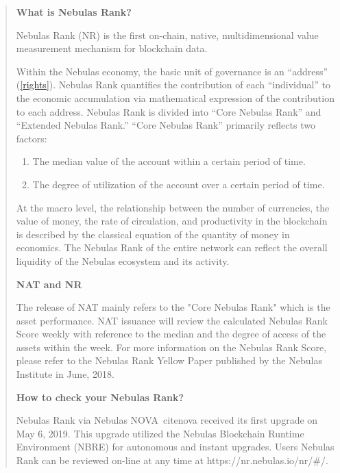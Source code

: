 \begin{quote}
	\textbf{What is Nebulas Rank?}
		
	Nebulas Rank (NR) is the first on-chain, native, multidimensional value measurement mechanism for blockchain data.

	Within the Nebulas economy, the basic unit of governance is an “address” (\ref{rights}). Nebulas Rank quantifies the contribution of each “individual” to the economic accumulation via mathematical expression of the contribution to each address. Nebulas Rank is divided into “Core Nebulas Rank” and “Extended Nebulas Rank.” “Core Nebulas Rank” primarily reflects two factors:

	\begin{enumerate}
		\item The median value of the account within a certain period of time.
		\item The degree of utilization of the account over a certain period of time.
	\end{enumerate}

	At the macro level, the relationship between the number of currencies, the value of money, the rate of circulation, and productivity in the blockchain is described by the classical equation of the quantity of money in economics. The Nebulas Rank of the entire network can reflect the overall liquidity of the Nebulas ecosystem and its activity.

	\vspace{2em}

	\textbf{NAT and NR}

	The release of NAT mainly refers to the "Core Nebulas Rank" which is the asset performance. NAT issuance will review the calculated Nebulas Rank Score weekly with reference to the median and the degree of access of the assets within the week. For more information on the Nebulas Rank Score, please refer to the Nebulas Rank Yellow Paper published by the Nebulas Institute in June, 2018.

	\vspace{2em}

	\textbf{How to check your Nebulas Rank?}

Nebulas Rank via Nebulas NOVA~cite{nova} received its first upgrade on  May 6, 2019. This upgrade utilized the Nebulas Blockchain Runtime Environment (NBRE) for autonomous and instant upgrades. Users Nebulas Rank can be reviewed on-line at any time at https://nr.nebulas.io/nr/#/.
\end{quote}


